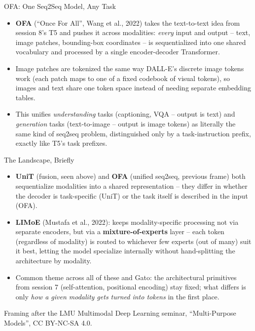 \begin{vbframe}{OFA: One Seq2Seq Model, Any Task}
\begin{itemize}
  \item \textbf{OFA} (``Once For All'', Wang et al., 2022) takes the text-to-text idea from session 8's T5 and pushes it across modalities: \emph{every} input and output -- text, image patches, bounding-box coordinates -- is sequentialized into one shared vocabulary and processed by a single encoder-decoder Transformer.
  \item Image patches are tokenized the same way DALL-E's discrete image tokens work (each patch maps to one of a fixed codebook of visual tokens), so images and text share one token space instead of needing separate embedding tables.
  \item This unifies \emph{understanding} tasks (captioning, VQA -- output is text) and \emph{generation} tasks (text-to-image -- output is image tokens) as literally the same kind of seq2seq problem, distinguished only by a task-instruction prefix, exactly like T5's task prefixes.
\end{itemize}
\end{vbframe}

\begin{vbframe}{The Landscape, Briefly}
\begin{itemize}
  \item \textbf{UniT} (fusion, seen above) and \textbf{OFA} (unified seq2seq, previous frame) both sequentialize modalities into a shared representation -- they differ in whether the decoder is task-specific (UniT) or the task itself is described in the input (OFA).
  \item \textbf{LIMoE} (Mustafa et al., 2022): keeps modality-specific processing not via separate encoders, but via a \textbf{mixture-of-experts} layer -- each token (regardless of modality) is routed to whichever few experts (out of many) suit it best, letting the model specialize internally without hand-splitting the architecture by modality.
  \item Common theme across all of these and Gato: the architectural primitives from session 7 (self-attention, positional encoding) stay fixed; what differs is only \emph{how a given modality gets turned into tokens} in the first place.
\end{itemize}
{\footnotesize Framing after the LMU Multimodal Deep Learning seminar, \enquote{Multi-Purpose Models}, CC BY-NC-SA 4.0.}
\end{vbframe}

